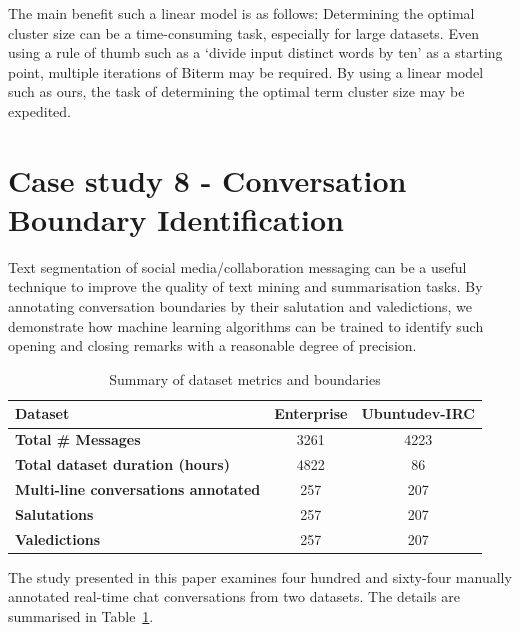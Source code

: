 The main benefit such a linear model is as follows: Determining the optimal cluster size can be a time-consuming task, especially for large datasets. Even using a rule of thumb such as a `divide input distinct words by ten' as a starting point, multiple iterations of Biterm may be required. By using a linear model such as ours, the task of determining the optimal term cluster size may be expedited. 

\section{Case study 8 - Conversation Boundary Identification}

Text segmentation of social media/collaboration messaging can be a useful technique to improve the quality of text mining and summarisation tasks. By annotating conversation boundaries by their salutation and valedictions, we demonstrate how machine learning algorithms can be trained to identify such opening and closing remarks with a reasonable degree of precision.

\begin {table}[]
\caption {Summary of dataset metrics and boundaries} 
\label{tab:chap7_study2_tab5}
\begin{center}
\begin{tabular}{| p{6.2cm} | p{2.2cm} | p{3.5cm} |} 
\hline \textbf{Dataset} & \textbf{Enterprise} & \textbf{Ubuntudev-IRC}
\\ \hline \bf{Total \# Messages} & \multicolumn{0}{|c|}{3261} & \multicolumn{0}{|c|}{4223}
\\ \hline \bf{ Total dataset duration (hours)} & \multicolumn{0}{|c|}{4822} & \multicolumn{0}{|c|}{86}
\\ \hline \bf{Multi-line conversations annotated} & \multicolumn{0}{|c|}{257} & \multicolumn{0}{|c|}{207}
\\ \hline \bf{Salutations} & \multicolumn{0}{|c|}{257} & \multicolumn{0}{|c|}{207}
\\ \hline \bf{Valedictions} & \multicolumn{0}{|c|}{257} & \multicolumn{0}{|c|}{207}
\\ \hline
\end{tabular}
\end{center}
\end{table}

The study presented in this paper examines four hundred and sixty-four manually annotated real-time chat conversations from two datasets. The details are summarised in Table~\ref{tab:chap7_study2_tab5}. 


